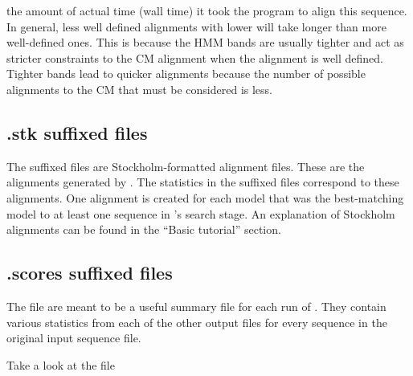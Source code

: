 \begin{wideitem}
\item[\emprog{elapsed}] the amount of actual time (wall time) it took
  the program to align this sequence. In general, less well defined
  alignments with lower  will take longer than more
  well-defined ones. This is because the HMM bands are usually tighter
  and act as stricter constraints to the CM alignment when the
  alignment is well defined. Tighter bands lead to quicker alignments
  because the number of possible alignments to the CM that must be
  considered is less.
\end{wideitem}

\subsection{.stk suffixed files}
The  suffixed files are Stockholm-formatted alignment
files. These are the alignments generated by . The
statistics in the  suffixed files correspond to these
alignments. One alignment is created for each model that was the
best-matching model to at least one sequence in 's
search stage. An explanation of Stockholm alignments can be found in
the ``Basic tutorial'' section.

\subsection{.scores suffixed files}

The  file are meant to be a useful summary file for each
run of . They contain various statistics from each of
the other output files for every sequence in the original input
sequence file. 

Take a look at the file 

